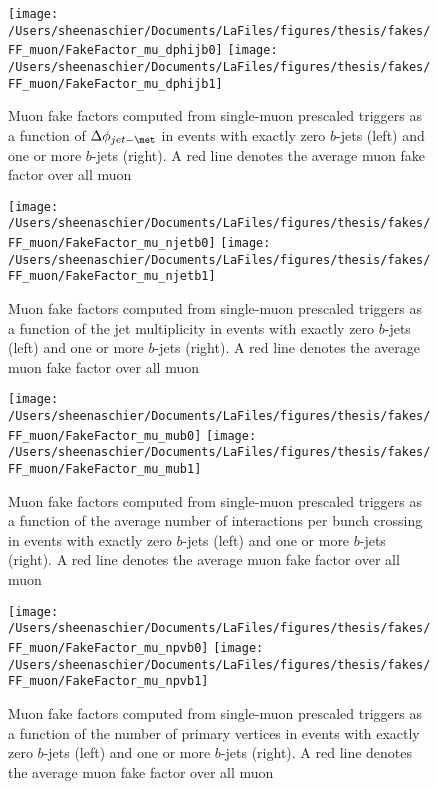 \begin{figure}[tbp]
  \centering
  \texttt{[image: /Users/sheenaschier/Documents/LaFiles/figures/thesis/fakes/FF\_muon/FakeFactor\_mu\_dphijb0]}
  \texttt{[image: /Users/sheenaschier/Documents/LaFiles/figures/thesis/fakes/FF\_muon/FakeFactor\_mu\_dphijb1]}
  \caption{Muon fake factors computed from single-muon prescaled triggers as a function of $\Delta\phi_{jet-\met}$ in events with exactly zero $b$-jets (left) and one or more $b$-jets (right).  A red line denotes the average muon fake factor over all muon \pt{}}
  \label{fig:muon_FF_dphij1}
\end{figure}

\begin{figure}[tbp]
  \centering
  \texttt{[image: /Users/sheenaschier/Documents/LaFiles/figures/thesis/fakes/FF\_muon/FakeFactor\_mu\_njetb0]}
  \texttt{[image: /Users/sheenaschier/Documents/LaFiles/figures/thesis/fakes/FF\_muon/FakeFactor\_mu\_njetb1]}\\
  \caption{Muon fake factors computed from single-muon prescaled triggers as a function of the jet multiplicity in events with exactly zero $b$-jets (left) and one or more $b$-jets (right).  A red line denotes the average muon fake factor over all muon \pt{}}
  \label{fig:muon_FF_njet}
\end{figure}

\begin{figure}[tbp]
  \centering
  \texttt{[image: /Users/sheenaschier/Documents/LaFiles/figures/thesis/fakes/FF\_muon/FakeFactor\_mu\_mub0]}
  \texttt{[image: /Users/sheenaschier/Documents/LaFiles/figures/thesis/fakes/FF\_muon/FakeFactor\_mu\_mub1]}\\
  \caption{Muon fake factors computed from single-muon prescaled triggers as a function of the average number of interactions per bunch crossing in events with exactly zero $b$-jets (left) and one or more $b$-jets (right).  A red line denotes the average muon fake factor over all muon \pt{}}
  \label{fig:muon_FF_mu}
\end{figure}

\begin{figure}[tbp]
  \centering
  \texttt{[image: /Users/sheenaschier/Documents/LaFiles/figures/thesis/fakes/FF\_muon/FakeFactor\_mu\_npvb0]}
  \texttt{[image: /Users/sheenaschier/Documents/LaFiles/figures/thesis/fakes/FF\_muon/FakeFactor\_mu\_npvb1]}\\
  \caption{Muon fake factors computed from single-muon prescaled triggers as a function of the number of primary vertices in events with exactly zero $b$-jets (left) and one or more $b$-jets (right).  A red line denotes the average muon fake factor over all muon \pt{}}
  \label{fig:muon_FF_npv}
\end{figure}

